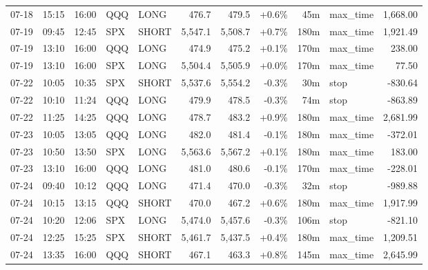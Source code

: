 \documentclass[11pt,a4paper,twoside]{article}
\begin{document}
\begin{center}
\begin{longtable}{>{\color{txtmain}}l l l l l r r r r >{\color{txtmain}}l r}
07-18 & 15:15 & 16:00 & QQQ & LONG & 476.7 & 479.5 & \textcolor{wingreen}{+0.6\%} & 45m & max\_time & \textcolor{wingreen}{1,668.00} \\
07-19 & 09:45 & 12:45 & SPX & SHORT & 5,547.1 & 5,508.7 & \textcolor{wingreen}{+0.7\%} & 180m & max\_time & \textcolor{wingreen}{1,921.49} \\
07-19 & 13:10 & 16:00 & QQQ & LONG & 474.9 & 475.2 & \textcolor{wingreen}{+0.1\%} & 170m & max\_time & \textcolor{wingreen}{238.00} \\
07-19 & 13:10 & 16:00 & SPX & LONG & 5,504.4 & 5,505.9 & \textcolor{wingreen}{+0.0\%} & 170m & max\_time & \textcolor{wingreen}{77.50} \\
07-22 & 10:05 & 10:35 & SPX & SHORT & 5,537.6 & 5,554.2 & \textcolor{lossred}{-0.3\%} & 30m & stop & \textcolor{lossred}{-830.64} \\
07-22 & 10:10 & 11:24 & QQQ & LONG & 479.9 & 478.5 & \textcolor{lossred}{-0.3\%} & 74m & stop & \textcolor{lossred}{-863.89} \\
07-22 & 11:25 & 14:25 & QQQ & LONG & 478.7 & 483.2 & \textcolor{wingreen}{+0.9\%} & 180m & max\_time & \textcolor{wingreen}{2,681.99} \\
07-23 & 10:05 & 13:05 & QQQ & LONG & 482.0 & 481.4 & \textcolor{lossred}{-0.1\%} & 180m & max\_time & \textcolor{lossred}{-372.01} \\
07-23 & 10:50 & 13:50 & SPX & LONG & 5,563.6 & 5,567.2 & \textcolor{wingreen}{+0.1\%} & 180m & max\_time & \textcolor{wingreen}{183.00} \\
07-23 & 13:10 & 16:00 & QQQ & LONG & 481.0 & 480.6 & \textcolor{lossred}{-0.1\%} & 170m & max\_time & \textcolor{lossred}{-228.01} \\
07-24 & 09:40 & 10:12 & QQQ & LONG & 471.4 & 470.0 & \textcolor{lossred}{-0.3\%} & 32m & stop & \textcolor{lossred}{-989.88} \\
07-24 & 10:15 & 13:15 & QQQ & SHORT & 470.0 & 467.2 & \textcolor{wingreen}{+0.6\%} & 180m & max\_time & \textcolor{wingreen}{1,917.99} \\
07-24 & 10:20 & 12:06 & SPX & LONG & 5,474.0 & 5,457.6 & \textcolor{lossred}{-0.3\%} & 106m & stop & \textcolor{lossred}{-821.10} \\
07-24 & 12:25 & 15:25 & SPX & SHORT & 5,461.7 & 5,437.5 & \textcolor{wingreen}{+0.4\%} & 180m & max\_time & \textcolor{wingreen}{1,209.51} \\
07-24 & 13:35 & 16:00 & QQQ & SHORT & 467.1 & 463.3 & \textcolor{wingreen}{+0.8\%} & 145m & max\_time & \textcolor{wingreen}{2,645.99} \\

\end{longtable}
\end{center}
\end{document}
